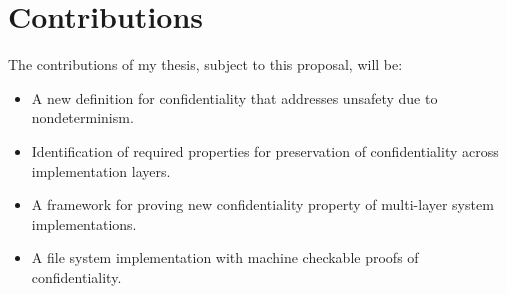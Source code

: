 \section{Contributions}

The contributions of my thesis, subject to this proposal, will be:

\begin{itemize}
 \item A new definition for confidentiality that addresses unsafety due to nondeterminism.
 \item Identification of required properties for preservation of confidentiality across implementation layers.
 \item A framework for proving new confidentiality property of multi-layer system implementations.
 \item A file system implementation with machine checkable proofs of confidentiality.
\end{itemize}